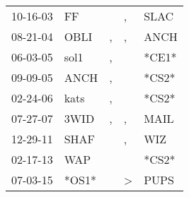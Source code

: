 \begin{supertabular}{p{0.07\textwidth}p{0.06\textwidth}p{0.02\textwidth}p{0.02\textwidth}p{0.06\textwidth}}
 10-16-03\textsuperscript{} &             FF\textsuperscript{} &               &             , &  SLAC\textsuperscript{} \\
 08-21-04\textsuperscript{} &           OBLI\textsuperscript{} &             , &             , &  ANCH\textsuperscript{} \\
 06-03-05\textsuperscript{} &           sol1\textsuperscript{} &             , &               &                   *CE1* \\
 09-09-05\textsuperscript{} &           ANCH\textsuperscript{} &             , &               &                   *CS2* \\
 02-24-06\textsuperscript{} &           kats\textsuperscript{} &             , &               &                   *CS2* \\
 07-27-07\textsuperscript{} &           3WID\textsuperscript{} &             , &             , &  MAIL\textsuperscript{} \\
 12-29-11\textsuperscript{} &           SHAF\textsuperscript{} &               &             , &   WIZ\textsuperscript{} \\
 02-17-13\textsuperscript{} &            WAP\textsuperscript{} &               &               &                   *CS2* \\
 07-03-15\textsuperscript{} &                            *OS1* &               &  \textgreater &  PUPS\textsuperscript{} \\
\end{supertabular}
